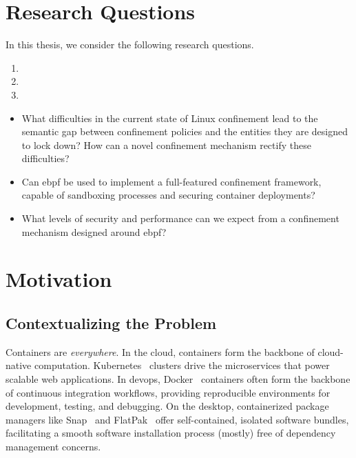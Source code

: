\section{Research Questions}%
\label{s:intro-rqs}

In this thesis, we consider the following research questions.

\begin{enumerate}[label=\textbf{RQ\arabic*.}]
  \item

  \item

  \item
\end{enumerate}

\begin{inprogress}
  \begin{itemize}
    \item What difficulties in the current state of Linux confinement lead to the semantic
          gap between confinement policies and the entities they are designed to lock down? How
          can a novel confinement mechanism rectify these difficulties?
    \item Can \gls{ebpf} be used to implement a full-featured confinement framework, capable of
          sandboxing processes and securing container deployments?
    \item What levels of security and performance can we expect from a confinement mechanism designed
          around \gls{ebpf}?
  \end{itemize}
\end{inprogress}

\section{Motivation}%
\label{s:motivation}

\subsection{Contextualizing the Problem}%
\label{ss:contextualizing-the-problem}

Containers are \textit{everywhere}. In the cloud, containers form the backbone of
cloud-native computation. Kubernetes~\cite{kubernetes} clusters drive the microservices
that power scalable web applications. In devops, Docker~\cite{docker_security} containers
often form the backbone of continuous integration workflows, providing reproducible
environments for development, testing, and debugging. On the desktop, containerized
package managers like Snap~\cite{snap} and FlatPak~\cite{flatpak} offer self-contained,
isolated software bundles, facilitating a smooth software installation process (mostly)
free of dependency management concerns.

